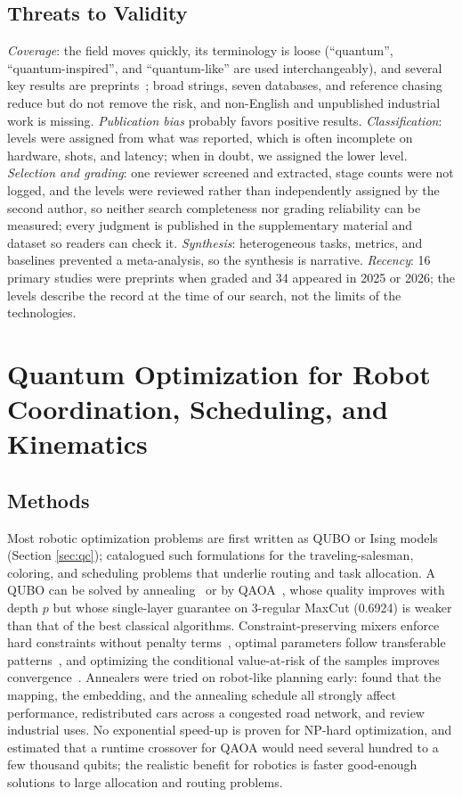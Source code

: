 \documentclass[acmsmall,screen,review]{acmart}
\begin{document}
\subsection{Threats to Validity}\label{sec:validity}
\emph{Coverage}: the field moves quickly, its terminology is loose (``quantum'', ``quantum-inspired'', and ``quantum-like'' are used interchangeably), and several key results are preprints~\cite{Altrabulsi2026,Muradoglu2025}; broad strings, seven databases, and reference chasing reduce but do not remove the risk, and non-English and unpublished industrial work is missing. \emph{Publication bias} probably favors positive results. \emph{Classification}: levels were assigned from what was reported, which is often incomplete on hardware, shots, and latency; when in doubt, we assigned the lower level. \emph{Selection and grading}: one reviewer screened and extracted, stage counts were not logged, and the levels were reviewed rather than independently assigned by the second author, so neither search completeness nor grading reliability can be measured; every judgment is published in the supplementary material and dataset so readers can check it. \emph{Synthesis}: heterogeneous tasks, metrics, and baselines prevented a meta-analysis, so the synthesis is narrative. \emph{Recency}: 16 primary studies were preprints when graded and 34 appeared in 2025 or 2026; the levels describe the record at the time of our search, not the limits of the technologies.

\section{Quantum Optimization for Robot Coordination, Scheduling, and Kinematics}\label{sec:opt}

\subsection{Methods}\label{sec:opt-methods}
Most robotic optimization problems are first written as QUBO or Ising models (Section \ref{sec:qc}); \citet{Lucas2014} catalogued such formulations for the traveling-salesman, coloring, and scheduling problems that underlie routing and task allocation. A QUBO can be solved by annealing~\cite{Johnson2011} or by QAOA~\cite{Farhi2014}, whose quality improves with depth $p$ but whose single-layer guarantee on 3-regular MaxCut (0.6924) is weaker than that of the best classical algorithms. Constraint-preserving mixers enforce hard constraints without penalty terms~\cite{Hadfield2019}, optimal parameters follow transferable patterns~\cite{Zhou2020}, and optimizing the conditional value-at-risk of the samples improves convergence~\cite{Barkoutsos2020}. Annealers were tried on robot-like planning early: \citet{Rieffel2015} found that the mapping, the embedding, and the annealing schedule all strongly affect performance, \citet{Neukart2017} redistributed cars across a congested road network, and \citet{Yarkoni2022} review industrial uses. No exponential speed-up is proven for NP-hard optimization, and \citet{Guerreschi2019} estimated that a runtime crossover for QAOA would need several hundred to a few thousand qubits; the realistic benefit for robotics is faster good-enough solutions to large allocation and routing problems.
\end{document}
